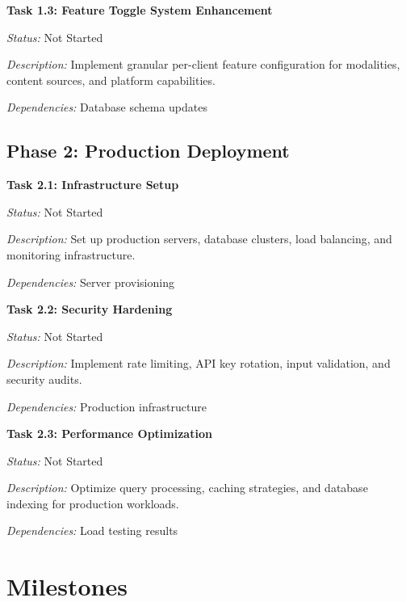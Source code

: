 \vspace{0.3cm}

\textbf{Task 1.3: Feature Toggle System Enhancement}

\textit{Status:} Not Started

\textit{Description:} Implement granular per-client feature configuration for modalities, content sources, and platform capabilities.

\textit{Dependencies:} Database schema updates

\subsection{Phase 2: Production Deployment}

\textbf{Task 2.1: Infrastructure Setup}

\textit{Status:} Not Started

\textit{Description:} Set up production servers, database clusters, load balancing, and monitoring infrastructure.

\textit{Dependencies:} Server provisioning

\vspace{0.3cm}

\textbf{Task 2.2: Security Hardening}

\textit{Status:} Not Started

\textit{Description:} Implement rate limiting, API key rotation, input validation, and security audits.

\textit{Dependencies:} Production infrastructure

\vspace{0.3cm}

\textbf{Task 2.3: Performance Optimization}

\textit{Status:} Not Started

\textit{Description:} Optimize query processing, caching strategies, and database indexing for production workloads.

\textit{Dependencies:} Load testing results

\section{Milestones}

